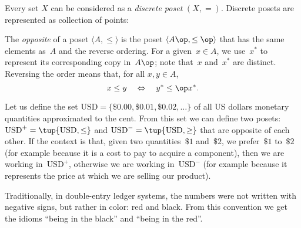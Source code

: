\begin{figure}[h!]
   \centering
   \caption{\label{fig:hasse}}
\end{figure}

\begin{example}
\label{ex:discreteposet}
{Every set $X$ can be considered as a \emph{discrete poset} $(X,=)$. Discrete posets are represented as collection of points:}
\begin{center}
\end{center}
\end{example}

\begin{definition}

    The \emph{opposite} of a  poset $\langle A, \leq \rangle $ is the poset $\langle A\op, \leq\op\rangle $ that has the same elements as~$A$ and the reverse ordering.
    For a given~$x \in A$, we use~$x^*$ to represent its corresponding copy in~$A\op$;
    note that~$x$ and~$x^*$ are distinct.
    Reversing the order means that, for all $x,y\in A$,
    \begin{equation}
        x \leq y \quad \Leftrightarrow \quad y^* \leq\op x^*.
    \end{equation}

\end{definition}

\begin{figure}[h!]
   \centering
   \caption{\label{fig:opposite}}
\end{figure}


\begin{example}
   Let us define the set $\text{USD}=\{\$0.00,\$0.01,\$0.02,\dots\}$
   of all US dollars monetary quantities approximated to the cent.
   From this set we can define two posets:
       $\text{USD}^{+} = \tup{\text{USD}, \leq}$
       and $\text{USD}^{-} = \tup{\text{USD}, \geq}$
       that are opposite of each other.
   If the context is that, given two quantities~$\$1$ and~$\$2$,
   we prefer~$\$1$ to~$\$2$ (for example because it is a cost to pay to acquire a component), then we are working in~$\text{USD}^{+}$,
   otherwise we are working in~$\text{USD}^{-}$ (for example
   because it represents the price at which we are selling our product).

   Traditionally, in double-entry ledger systems, the numbers were not
   written with negative signs, but rather in color: red and black.
   From this convention we get the idioms ``being in the black''
   and ``being in the red''.

\end{example}



